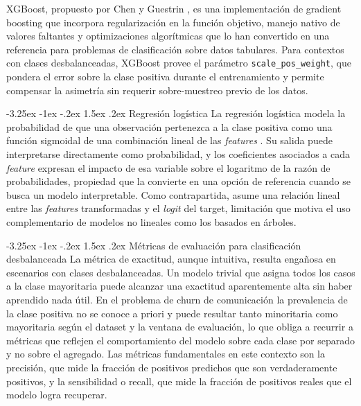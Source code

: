 \documentclass[11pt,a4paper]{article}
\makeatletter
\renewcommand\subsection{\@startsection{subsection}{2}{\z@}%
  {-3.25ex \@plus -1ex \@minus -.2ex}%
  {1.5ex \@plus .2ex}%
  {\normalfont\normalsize\itshape}}
\makeatother
\begin{document}
XGBoost, propuesto por Chen y Guestrin \cite{chen2016xgboost}, es una implementación de gradient boosting que incorpora regularización en la función objetivo, manejo nativo de valores faltantes y optimizaciones algorítmicas que lo han convertido en una referencia para problemas de clasificación sobre datos tabulares. Para contextos con clases desbalanceadas, XGBoost provee el parámetro \texttt{scale\_pos\_weight}, que pondera el error sobre la clase positiva durante el entrenamiento y permite compensar la asimetría sin requerir sobre-muestreo previo de los datos.

\subsection{Regresión logística}
La regresión logística modela la probabilidad de que
una observación pertenezca a la clase positiva como
una función sigmoidal de una combinación lineal de
las \textit{features} \cite{hastie2009elements}. Su
salida puede interpretarse directamente como
probabilidad, y los coeficientes asociados a cada
\textit{feature} expresan el impacto de esa variable
sobre el logaritmo de la razón de probabilidades,
propiedad que la convierte en una opción de referencia
cuando se busca un modelo interpretable. Como
contrapartida, asume una relación lineal entre las
\textit{features} transformadas y el \textit{logit}
del target, limitación que motiva el uso complementario
de modelos no lineales como los basados en árboles.
 
\subsection{Métricas de evaluación para clasificación desbalanceada}
La métrica de exactitud, aunque intuitiva, resulta engañosa en escenarios con clases desbalanceadas. Un modelo trivial que asigna todos los casos a la clase mayoritaria puede alcanzar una exactitud aparentemente alta sin haber aprendido nada útil. En el problema de churn de comunicación la prevalencia de la clase positiva no se conoce a priori y puede resultar tanto minoritaria como mayoritaria según el dataset y la ventana de evaluación, lo que obliga a recurrir a métricas que reflejen el comportamiento del modelo sobre cada clase por separado y no sobre el agregado. Las métricas fundamentales en este contexto son la precisión, que mide la fracción de positivos predichos que son verdaderamente positivos, y la sensibilidad o recall, que mide la fracción de positivos reales que el modelo logra recuperar.
 
\end{document}
